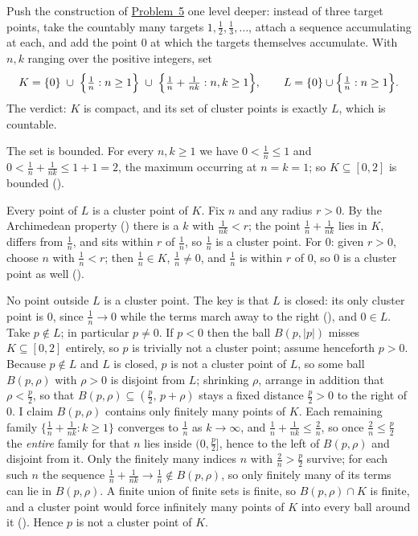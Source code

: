 \documentclass[main.tex]{subfiles}
\begin{document}
\begin{SolutionBlue}
Push the construction of \hyperlink{prob:5}{Problem~5} one level deeper: instead of three target points,
take the countably many targets $1,\tfrac12,\tfrac13,\dots$, attach a sequence accumulating at each, and add
the point $0$ at which the targets themselves accumulate. With $n,k$ ranging over the positive integers, set
\[
K=\{0\}\;\cup\;\Bigl\{\tfrac1n:n\ge 1\Bigr\}\;\cup\;\Bigl\{\tfrac1n+\tfrac{1}{nk}:n,k\ge 1\Bigr\},
\qquad
L=\{0\}\cup\Bigl\{\tfrac1n:n\ge 1\Bigr\}.
\]
The verdict: $K$ is compact, and its set of cluster points is exactly $L$, which is countable.

The set is bounded. For every $n,k\ge 1$ we have $0<\tfrac1n\le 1$ and $0<\tfrac1n+\tfrac1{nk}\le 1+1=2$,
the maximum occurring at $n=k=1$; so $K\subseteq[0,2]$ is bounded ().

Every point of $L$ is a cluster point of $K$. Fix $n$ and any radius $r>0$. By the Archimedean property
() there is a $k$ with $\tfrac{1}{nk}<r$; the point $\tfrac1n+\tfrac1{nk}$
lies in $K$, differs from $\tfrac1n$, and sits within $r$ of $\tfrac1n$, so $\tfrac1n$ is a cluster point.
For $0$: given $r>0$, choose $n$ with $\tfrac1n<r$; then $\tfrac1n\in K$, $\tfrac1n\neq 0$, and $\tfrac1n$ is
within $r$ of $0$, so $0$ is a cluster point as well ().

No point outside $L$ is a cluster point. The key is that $L$ is closed: its only cluster point is $0$, since
$\tfrac1n\to 0$ while the terms march away to the right (), and $0\in L$. Take $p\notin L$; in
particular $p\neq 0$. If $p<0$ then the ball $B(p,|p|)$ misses $K\subseteq[0,2]$ entirely, so $p$ is trivially
not a cluster point; assume henceforth $p>0$. Because
$p\notin L$ and $L$ is closed, $p$ is not a cluster point of $L$, so some ball $B(p,\rho)$ with $\rho>0$ is
disjoint from $L$; shrinking $\rho$, arrange in addition that $\rho<\tfrac{p}{2}$, so that
$B(p,\rho)\subseteq(\tfrac{p}{2},\,p+\rho)$ stays a fixed distance $\tfrac{p}{2}>0$ to the right of $0$. I claim
$B(p,\rho)$ contains only finitely many points of $K$. Each remaining family $\{\tfrac1n+\tfrac1{nk}:k\ge1\}$
converges to $\tfrac1n$ as $k\to\infty$, and $\tfrac1n+\tfrac1{nk}\le\tfrac2n$, so once $\tfrac2n\le\tfrac{p}{2}$ the
\emph{entire} family for that $n$ lies inside $(0,\tfrac{p}{2}]$, hence to the left of $B(p,\rho)$ and disjoint
from it. Only the finitely many indices $n$ with $\tfrac2n>\tfrac{p}{2}$ survive; for each such
$n$ the sequence $\tfrac1n+\tfrac1{nk}\to\tfrac1n\notin B(p,\rho)$, so only finitely many of its terms can
lie in $B(p,\rho)$. A finite union of finite sets is finite, so $B(p,\rho)\cap K$ is finite, and a cluster
point would force infinitely many points of $K$ into every ball around it
(). Hence $p$ is not a cluster
point of $K$.


\end{SolutionBlue}
\end{document}
